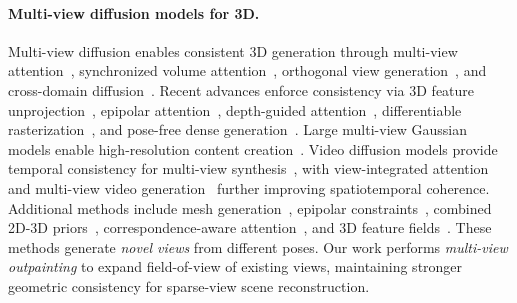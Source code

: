 \documentclass[runningheads]{llncs}
\begin{document}
\paragraph{Multi-view diffusion models for 3D.}
Multi-view diffusion enables consistent 3D generation through multi-view attention~\cite{shi2023mvdream,wang2023imagedream}, synchronized volume attention~\cite{liu2023syncdreamer}, orthogonal view generation~\cite{shi2023zero123++}, and cross-domain diffusion~\cite{long2024wonder3d}. Recent advances enforce consistency via 3D feature unprojection~\cite{yang2024consistnet}, epipolar attention~\cite{huang2024epidiff,kuang2024collaborative}, depth-guided attention~\cite{hu2024mvd}, differentiable rasterization~\cite{lu2024direct2}, and pose-free dense generation~\cite{tang2024mvdiffusion++}. Large multi-view Gaussian models enable high-resolution content creation~\cite{tang2024lgm}. Video diffusion models provide temporal consistency for multi-view synthesis~\cite{voleti2024sv3d,gao2024cat3d,kwak2024vivid,zhang20244diffusion,chen2024mvsplat360,chen2024v3d,yu2024viewcrafter}, with view-integrated attention~\cite{xu2024cavia} and multi-view video generation~\cite{li2024vivid} further improving spatiotemporal coherence. Additional methods include mesh generation~\cite{xu2024instantmesh}, epipolar constraints~\cite{li2024era3d}, combined 2D-3D priors~\cite{liu2024one}, correspondence-aware attention~\cite{Tang2023mvdiffusion}, and 3D feature fields~\cite{chan2023generative}. These methods generate \emph{novel views} from different poses. Our work performs \emph{multi-view outpainting} to expand field-of-view of existing views, maintaining stronger geometric consistency for sparse-view scene reconstruction.
\end{document}
